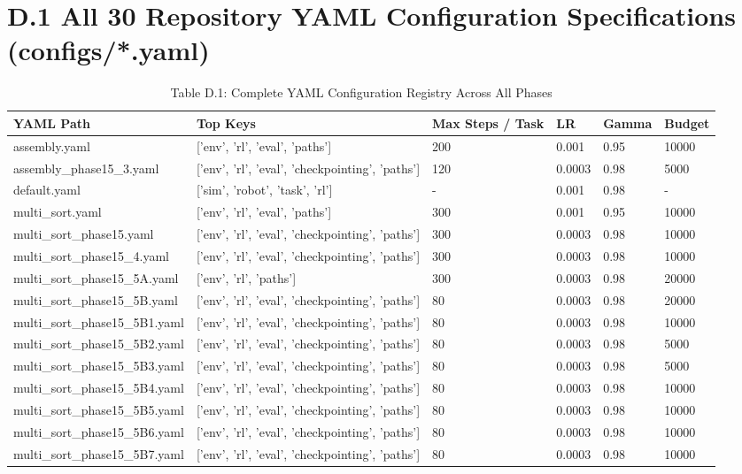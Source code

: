 \documentclass[11pt,a4paper,oneside]{book}
\begin{document}
\section{D.1 All 30 Repository YAML Configuration Specifications (configs/*.yaml)}
\begin{longtable}{l l l l l l}\caption{Table D.1: Complete YAML Configuration Registry Across All Phases}\\\toprule
YAML Path & Top Keys & Max Steps / Task & LR & Gamma & Budget \\ \midrule \endhead
assembly.yaml & ['env', 'rl', 'eval', 'paths'] & 200 & 0.001 & 0.95 & 10000 \\
assembly\_phase15\_3.yaml & ['env', 'rl', 'eval', 'checkpointing', 'paths'] & 120 & 0.0003 & 0.98 & 5000 \\
default.yaml & ['sim', 'robot', 'task', 'rl'] & - & 0.001 & 0.98 & - \\
multi\_sort.yaml & ['env', 'rl', 'eval', 'paths'] & 300 & 0.001 & 0.95 & 10000 \\
multi\_sort\_phase15.yaml & ['env', 'rl', 'eval', 'checkpointing', 'paths'] & 300 & 0.0003 & 0.98 & 10000 \\
multi\_sort\_phase15\_4.yaml & ['env', 'rl', 'eval', 'checkpointing', 'paths'] & 300 & 0.0003 & 0.98 & 10000 \\
multi\_sort\_phase15\_5A.yaml & ['env', 'rl', 'paths'] & 300 & 0.0003 & 0.98 & 20000 \\
multi\_sort\_phase15\_5B.yaml & ['env', 'rl', 'eval', 'checkpointing', 'paths'] & 80 & 0.0003 & 0.98 & 20000 \\
multi\_sort\_phase15\_5B1.yaml & ['env', 'rl', 'eval', 'checkpointing', 'paths'] & 80 & 0.0003 & 0.98 & 10000 \\
multi\_sort\_phase15\_5B2.yaml & ['env', 'rl', 'eval', 'checkpointing', 'paths'] & 80 & 0.0003 & 0.98 & 5000 \\
multi\_sort\_phase15\_5B3.yaml & ['env', 'rl', 'eval', 'checkpointing', 'paths'] & 80 & 0.0003 & 0.98 & 5000 \\
multi\_sort\_phase15\_5B4.yaml & ['env', 'rl', 'eval', 'checkpointing', 'paths'] & 80 & 0.0003 & 0.98 & 10000 \\
multi\_sort\_phase15\_5B5.yaml & ['env', 'rl', 'eval', 'checkpointing', 'paths'] & 80 & 0.0003 & 0.98 & 10000 \\
multi\_sort\_phase15\_5B6.yaml & ['env', 'rl', 'eval', 'checkpointing', 'paths'] & 80 & 0.0003 & 0.98 & 10000 \\
multi\_sort\_phase15\_5B7.yaml & ['env', 'rl', 'eval', 'checkpointing', 'paths'] & 80 & 0.0003 & 0.98 & 10000 \\

\end{longtable}
\end{document}
